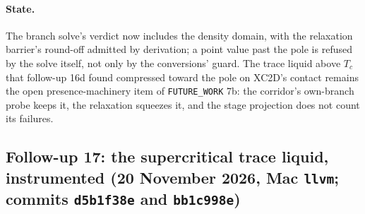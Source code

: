 \documentclass[11pt,a4paper]{article}
\newcommand{\code}[1]{\texttt{\small #1}}
\begin{document}
\paragraph{State.}  The branch solve's verdict now includes the
density domain, with the relaxation barrier's round-off admitted by
derivation; a point value past the pole is refused by the solve itself,
not only by the conversions' guard.  The trace liquid above $T_c$ that
follow-up 16d found compressed toward the pole on XC2D's contact remains
the open presence-machinery item of \code{FUTURE\_WORK} 7b: the
corridor's own-branch probe keeps it, the relaxation squeezes it, and
the stage projection does not count its failures.


\subsection{Follow-up 17: the supercritical trace liquid, instrumented (20 November 2026, Mac \code{llvm}; commits \code{d5b1f38e} and \code{bb1c998e})}
\end{document}
